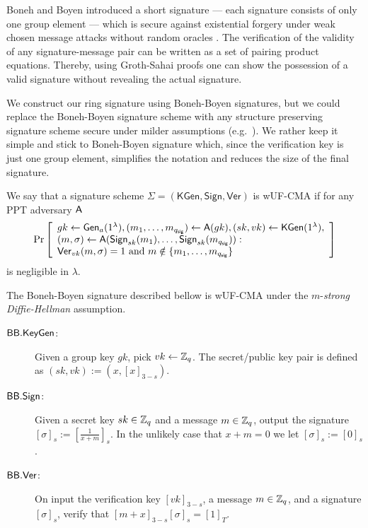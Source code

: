 

Boneh and Boyen introduced a short signature --- each signature consists of only one group element --- which is secure against existential forgery under weak chosen message attacks without random oracles \cite{EC:BonBoy04a}.
The verification of the validity of any signature-message pair can be written as a set of pairing product equations. Thereby, using Groth-Sahai proofs one can show the possession of a valid signature without revealing the actual signature.

We construct our ring signature using Boneh-Boyen signatures, but we could replace the Boneh-Boyen signature scheme with any structure preserving signature scheme secure under milder assumptions (e.g.~\cite{EPRINT:JutRoy17}). We rather keep it simple and stick to Boneh-Boyen signature which, since the verification key is just one group element, simplifies the notation and reduces the size of the final signature.
 
\begin{definition} We say that a signature scheme $\Sigma = (\mathsf{KGen},\mathsf{Sign},\mathsf{Ver})$ is wUF-CMA if for any PPT adversary $\mathsf{A}$
	$$
	\Pr\left[\begin{array}{l}
	gk \gets \mathsf{Gen}_a(1^\lambda), (m_1,\ldots,m_{q_\mathsf{sig}})\gets\mathsf{A}(gk), (sk,vk)\gets\mathsf{KGen}(1^\lambda), \\
	(m,\sigma)\gets\mathsf{A}(\mathsf{Sign}_{sk}(m_1),\ldots,\mathsf{Sign}_{sk}(m_{q_\mathsf{sig}})):\\
	\mathsf{Ver}_{vk}(m,\sigma)=1 \text{ and } m\notin \{m_1,\ldots,m_{q_\mathsf{sig}}\}
	\end{array}\right]
	$$
is negligible in $\lambda$.
\end{definition}

The Boneh-Boyen signature described bellow is wUF-CMA under the $m$-\emph{strong Diffie-Hellman} assumption.
%
%

\begin{description}
\item[$\mathsf{BB}.\mathsf{KeyGen}$:] Given a group key $gk$, pick $vk\gets\mathbb{Z}_q$. The secret/public key pair is defined as $(sk,vk):=(x,[x]_{3-s})$.
\item[$\mathsf{BB}.\mathsf{Sign}$:] Given a secret key $sk\in\mathbb{Z}_q$ and a message $m\in\mathbb{Z}_q$, output the signature $[\sigma]_{s}:=\left[\frac{1}{x+m}\right]_{s}$. In the unlikely case that $x+m=0$ we let $[\sigma]_{s}:=[0]_{s}$.
\item[$\mathsf{BB}.\mathsf{Ver}$:] On input the verification key $[vk]_{3-s}$, a message $m\in\mathbb{Z}_q$, and a signature $[\sigma]_{s}$, verify that $[m+x]_{3-s}[\sigma]_{s}=[1]_T$.
\end{description} 

